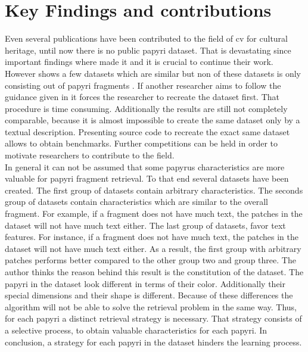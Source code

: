 \section{Key Findings and contributions}
\label{sec:findings}
Even several publications have been contributed to the field of \ac{cv} for cultural heritage, until now there is no public papyri dataset. That is devastating since important findings where made it and it is crucial to continue their work. However  shows a few datasets which are similar but non of these datasets is only consisting out of papyri fragments \cite{Tensmeyer20}. If another researcher aims to follow the guidance given in  it forces the researcher to recreate the dataset first. That procedure is time consuming. Additionally the results are still not completely comparable, because it is almost impossible to create the same dataset only by a textual description. Presenting source code to recreate the exact same dataset allows to obtain benchmarks. Further competitions can be held in order to motivate researchers to contribute to the field.\\

\noindent In general it can not be assumed that some papyrus characteristics are more valuable for papyri fragment retrieval. To that end several datasets have been created. The first group of datasets contain arbitrary characteristics. The seconds group of datasets contain characteristics which are similar to the overall fragment. For example, if a fragment does not have much text, the patches in the dataset will not have much text either. The last group of datasets, favor text features. For instance, if a fragment does not have much text, the patches in the dataset will not have much text either. As a result, the first group with arbitrary patches performs better compared to the other group two and group three. The author thinks the reason behind this result is the constitution of the dataset. The papyri in the dataset look different in terms of their color. Additionally their special dimensions and their shape is different. Because of these differences the algorithm will not be able to solve the retrieval problem in the same way. Thus, for each papyri a distinct retrieval strategy is necessary. That strategy consists of a selective process, to obtain valuable characteristics for each papyri. In conclusion, a strategy for each papyri in the dataset hinders the learning process.\\

